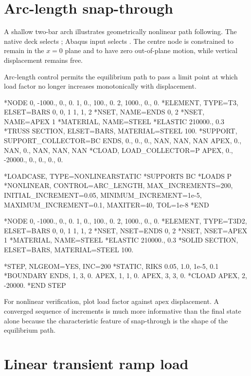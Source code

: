 \section{Arc-length snap-through}

A shallow two-bar arch illustrates geometrically nonlinear path following. The native deck selects ; Abaqus input selects . The centre node is constrained to remain in the \(x=0\) plane and to have zero out-of-plane motion, while vertical displacement remains free.

Arc-length control permits the equilibrium path to pass a limit point at which load factor no longer increases monotonically with displacement.

\begin{dialectexamples}
\begin{femasterdeck}
*NODE
0, -1000.,   0., 0.
1,     0., 100., 0.
2,  1000.,   0., 0.
*ELEMENT, TYPE=T3, ELSET=BARS
0, 0, 1
1, 1, 2
*NSET, NAME=ENDS
0, 2
*NSET, NAME=APEX
1
*MATERIAL, NAME=STEEL
*ELASTIC
210000., 0.3
*TRUSS SECTION, ELSET=BARS, MATERIAL=STEEL
100.
*SUPPORT, SUPPORT_COLLECTOR=BC
ENDS, 0., 0., 0., NAN, NAN, NAN
APEX, 0., NAN, 0., NAN, NAN, NAN
*CLOAD, LOAD_COLLECTOR=P
APEX, 0., -20000., 0., 0., 0., 0.

*LOADCASE, TYPE=NONLINEARSTATIC
*SUPPORTS
BC
*LOADS
P
*NONLINEAR, CONTROL=ARC_LENGTH,
 MAX_INCREMENTS=200,
 INITIAL_INCREMENT=0.05,
 MINIMUM_INCREMENT=1e-5,
 MAXIMUM_INCREMENT=0.1,
 MAXITER=40, TOL=1e-8
*END
\end{femasterdeck}
\begin{abaqusdeck}
*NODE
0, -1000.,   0., 0.
1,     0., 100., 0.
2,  1000.,   0., 0.
*ELEMENT, TYPE=T3D2, ELSET=BARS
0, 0, 1
1, 1, 2
*NSET, NSET=ENDS
0, 2
*NSET, NSET=APEX
1
*MATERIAL, NAME=STEEL
*ELASTIC
210000., 0.3
*SOLID SECTION, ELSET=BARS, MATERIAL=STEEL
100.

*STEP, NLGEOM=YES, INC=200
*STATIC, RIKS
0.05, 1.0, 1e-5, 0.1
*BOUNDARY
ENDS, 1, 3, 0.
APEX, 1, 1, 0.
APEX, 3, 3, 0.
*CLOAD
APEX, 2, -20000.
*END STEP
\end{abaqusdeck}
\end{dialectexamples}

For nonlinear verification, plot load factor against apex displacement. A converged sequence of increments is much more informative than the final state alone because the characteristic feature of snap-through is the shape of the equilibrium path.

\section{Linear transient ramp load}

